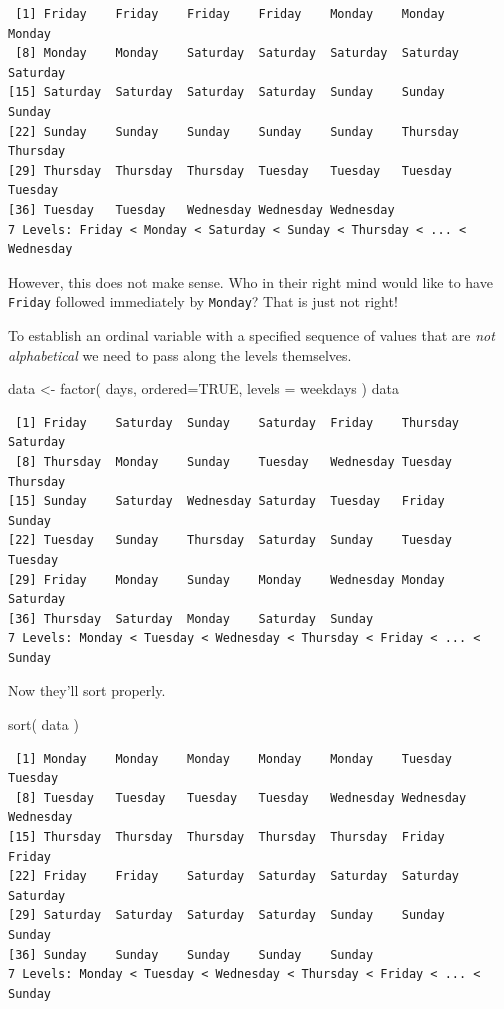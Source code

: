 \documentclass[
  letterpaper,
]{book}
\newenvironment{Shaded}{\begin{snugshade}}{\end{snugshade}}
\newcommand{\AttributeTok}[1]{\textcolor[rgb]{0.40,0.45,0.13}{#1}}
\newcommand{\ConstantTok}[1]{\textcolor[rgb]{0.56,0.35,0.01}{#1}}
\newcommand{\FunctionTok}[1]{\textcolor[rgb]{0.28,0.35,0.67}{#1}}
\newcommand{\NormalTok}[1]{\textcolor[rgb]{0.00,0.23,0.31}{#1}}
\newcommand{\OtherTok}[1]{\textcolor[rgb]{0.00,0.23,0.31}{#1}}
\begin{document}
\begin{verbatim}
 [1] Friday    Friday    Friday    Friday    Monday    Monday    Monday   
 [8] Monday    Monday    Saturday  Saturday  Saturday  Saturday  Saturday 
[15] Saturday  Saturday  Saturday  Saturday  Sunday    Sunday    Sunday   
[22] Sunday    Sunday    Sunday    Sunday    Sunday    Thursday  Thursday 
[29] Thursday  Thursday  Thursday  Tuesday   Tuesday   Tuesday   Tuesday  
[36] Tuesday   Tuesday   Wednesday Wednesday Wednesday
7 Levels: Friday < Monday < Saturday < Sunday < Thursday < ... < Wednesday
\end{verbatim}

However, this does not make sense. Who in their right mind would like to
have \texttt{Friday} followed immediately by \texttt{Monday}? That is
just not right!

To establish an ordinal variable with a specified sequence of values
that are \emph{not alphabetical} we need to pass along the levels
themselves.

\begin{Shaded}
\begin{Highlighting}[]
\NormalTok{data }\OtherTok{\textless{}{-}} \FunctionTok{factor}\NormalTok{( days, }\AttributeTok{ordered=}\ConstantTok{TRUE}\NormalTok{, }\AttributeTok{levels =}\NormalTok{ weekdays )}
\NormalTok{data}
\end{Highlighting}
\end{Shaded}

\begin{verbatim}
 [1] Friday    Saturday  Sunday    Saturday  Friday    Thursday  Saturday 
 [8] Thursday  Monday    Sunday    Tuesday   Wednesday Tuesday   Thursday 
[15] Sunday    Saturday  Wednesday Saturday  Tuesday   Friday    Sunday   
[22] Tuesday   Sunday    Thursday  Saturday  Sunday    Tuesday   Tuesday  
[29] Friday    Monday    Sunday    Monday    Wednesday Monday    Saturday 
[36] Thursday  Saturday  Monday    Saturday  Sunday   
7 Levels: Monday < Tuesday < Wednesday < Thursday < Friday < ... < Sunday
\end{verbatim}

Now they'll sort properly.

\begin{Shaded}
\begin{Highlighting}[]
\FunctionTok{sort}\NormalTok{( data )}
\end{Highlighting}
\end{Shaded}

\begin{verbatim}
 [1] Monday    Monday    Monday    Monday    Monday    Tuesday   Tuesday  
 [8] Tuesday   Tuesday   Tuesday   Tuesday   Wednesday Wednesday Wednesday
[15] Thursday  Thursday  Thursday  Thursday  Thursday  Friday    Friday   
[22] Friday    Friday    Saturday  Saturday  Saturday  Saturday  Saturday 
[29] Saturday  Saturday  Saturday  Saturday  Sunday    Sunday    Sunday   
[36] Sunday    Sunday    Sunday    Sunday    Sunday   
7 Levels: Monday < Tuesday < Wednesday < Thursday < Friday < ... < Sunday
\end{verbatim}
\end{document}
